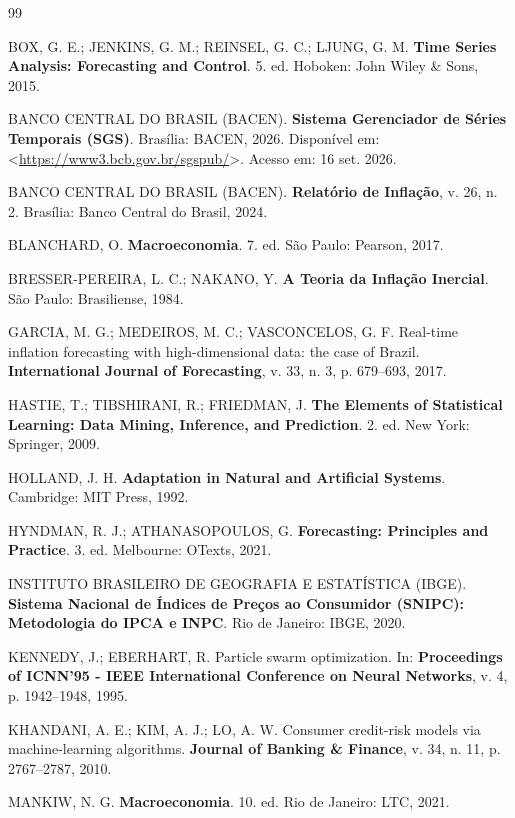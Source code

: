 \documentclass[10pt,twoside]{article}
\begin{document}
\begin{thebibliography}{99}

 BOX, G. E.; JENKINS, G. M.; REINSEL, G. C.; LJUNG, G. M. \textbf{Time Series Analysis: Forecasting and Control}. 5. ed. Hoboken: John Wiley \& Sons, 2015.

 BANCO CENTRAL DO BRASIL (BACEN). \textbf{Sistema Gerenciador de Séries Temporais (SGS)}. Brasília: BACEN, 2026. Disponível em: <\url{https://www3.bcb.gov.br/sgspub/}>. Acesso em: 16 set. 2026.

 BANCO CENTRAL DO BRASIL (BACEN). \textbf{Relatório de Inflação}, v. 26, n. 2. Brasília: Banco Central do Brasil, 2024.

 BLANCHARD, O. \textbf{Macroeconomia}. 7. ed. São Paulo: Pearson, 2017.

 BRESSER-PEREIRA, L. C.; NAKANO, Y. \textbf{A Teoria da Inflação Inercial}. São Paulo: Brasiliense, 1984.

 GARCIA, M. G.; MEDEIROS, M. C.; VASCONCELOS, G. F. Real-time inflation forecasting with high-dimensional data: the case of Brazil. \textbf{International Journal of Forecasting}, v. 33, n. 3, p. 679–693, 2017.

 HASTIE, T.; TIBSHIRANI, R.; FRIEDMAN, J. \textbf{The Elements of Statistical Learning: Data Mining, Inference, and Prediction}. 2. ed. New York: Springer, 2009.

 HOLLAND, J. H. \textbf{Adaptation in Natural and Artificial Systems}. Cambridge: MIT Press, 1992.

 HYNDMAN, R. J.; ATHANASOPOULOS, G. \textbf{Forecasting: Principles and Practice}. 3. ed. Melbourne: OTexts, 2021.

 INSTITUTO BRASILEIRO DE GEOGRAFIA E ESTATÍSTICA (IBGE). \textbf{Sistema Nacional de Índices de Preços ao Consumidor (SNIPC): Metodologia do IPCA e INPC}. Rio de Janeiro: IBGE, 2020.

 KENNEDY, J.; EBERHART, R. Particle swarm optimization. In: \textbf{Proceedings of ICNN'95 - IEEE International Conference on Neural Networks}, v. 4, p. 1942–1948, 1995.

 KHANDANI, A. E.; KIM, A. J.; LO, A. W. Consumer credit-risk models via machine-learning algorithms. \textbf{Journal of Banking \& Finance}, v. 34, n. 11, p. 2767–2787, 2010.

 MANKIW, N. G. \textbf{Macroeconomia}. 10. ed. Rio de Janeiro: LTC, 2021.


\end{thebibliography}
\end{document}
